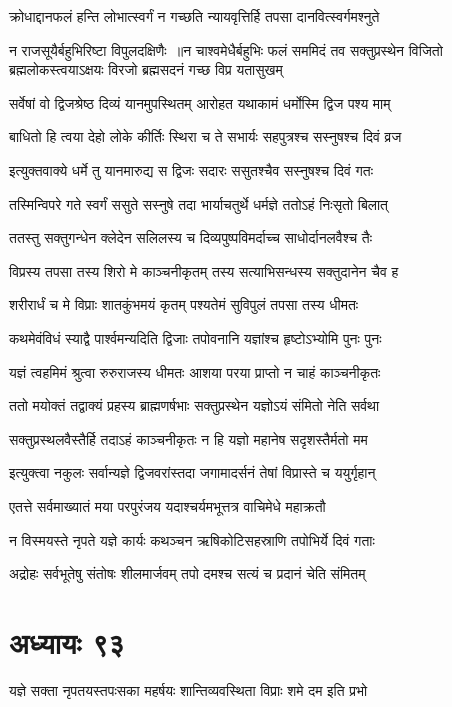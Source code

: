 \twolineshloka
{क्रोधाद्दानफलं हन्ति लोभात्स्वर्गं न गच्छति}
{न्यायवृत्तिर्हि तपसा दानवित्स्वर्गमश्नुते}


न राजसूयैर्बहुभिरिष्टा विपुलदक्षिणैः ॥न चाश्वमेधैर्बहुभिः फलं सममिदं तव
\twolineshloka
{सक्तुप्रस्थेन विजितो ब्रह्मलोकस्त्वयाऽक्षयः}
{विरजो ब्रह्मसदनं गच्छ विप्र यतासुखम्}


\twolineshloka
{सर्वेषां वो द्विजश्रेष्ठ दिव्यं यानमुपस्थितम्}
{आरोहत यथाकामं धर्मोस्मि द्विज पश्य माम्}


\twolineshloka
{बाधितो हि त्वया देहो लोके कीर्तिः स्थिरा च ते}
{सभार्यः सहपुत्रश्च सस्नुषश्च दिवं व्रज}


\twolineshloka
{इत्युक्तवाक्ये धर्मे तु यानमारुद्य स द्विजः}
{सदारः ससुतश्चैव सस्नुषश्च दिवं गतः}


\twolineshloka
{तस्मिन्विपरे गते स्वर्गं ससुते सस्नुषे तदा}
{भार्याचतुर्थे धर्मज्ञे ततोऽहं निःसृतो बिलात्}


\twolineshloka
{ततस्तु सक्तुगन्धेन क्लेदेन सलिलस्य च}
{दिव्यपुष्पविमर्दाच्च साधोर्दानलवैश्च तैः}


\twolineshloka
{विप्रस्य तपसा तस्य शिरो मे काञ्चनीकृतम्}
{तस्य सत्याभिसन्धस्य सक्तुदानेन चैव ह}


\twolineshloka
{शरीरार्धं च मे विप्राः शातकुंभमयं कृतम्}
{पश्यतेमं सुविपुलं तपसा तस्य धीमतः}


\threelineshloka
{कथमेवंविधं स्याद्वै पार्श्वमन्यदिति द्विजाः}
{तपोवनानि यज्ञांश्च हृष्टोऽभ्योमि पुनः पुनः}
{}


\twolineshloka
{यज्ञं त्वहमिमं श्रुत्वा रुरुराजस्य धीमतः}
{आशया परया प्राप्तो न चाहं काञ्चनीकृतः}


\twolineshloka
{ततो मयोक्तं तद्वाक्यं प्रहस्य ब्राह्मणर्षभाः}
{सक्तुप्रस्थेन यज्ञोऽयं संमितो नेति सर्वथा}


\twolineshloka
{सक्तुप्रस्थलवैस्तैर्हि तदाऽहं काञ्चनीकृतः}
{न हि यज्ञो महानेष सदृशस्तैर्मतो मम}


\twolineshloka
{इत्युक्त्वा नकुलः सर्वान्यज्ञे द्विजवरांस्तदा}
{जगामादर्सनं तेषां विप्रास्ते च ययुर्गृहान्}


\twolineshloka
{एतत्ते सर्वमाख्यातं मया परपुरंजय}
{यदाश्चर्यमभूत्तत्र वाचिमेधे महाक्रतौ}


\twolineshloka
{न विस्मयस्ते नृपते यज्ञे कार्यः कथञ्चन}
{ऋषिकोटिसहस्राणि तपोभिर्ये दिवं गताः}


\twolineshloka
{अद्रोहः सर्वभूतेषु संतोषः शीलमार्जवम्}
{तपो दमश्च सत्यं च प्रदानं चेति संमितम्}


\chapter{अध्यायः ९३}
\twolineshloka
{यज्ञे सक्ता नृपतयस्तपःसका महर्षयः}
{शान्तिव्यवस्थिता विप्राः शमे दम इति प्रभो}


